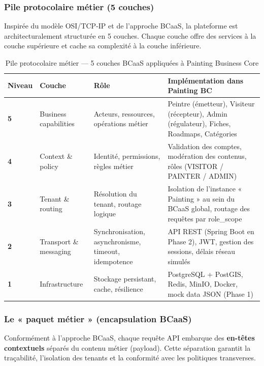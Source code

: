 \documentclass[12pt,a4paper]{report}
\begin{document}
\subsubsection*{Pile protocolaire métier (5 couches)}

Inspirée du modèle OSI/TCP-IP et de l'approche BCaaS, la plateforme est architecturalement structurée en 5 couches. Chaque couche offre des services à la couche supérieure et cache sa complexité à la couche inférieure.

\begin{table}[H]
\centering
\caption{Pile protocolaire métier --- 5 couches BCaaS appliquées à Painting Business Core}
\label{tab:protocol_stack}
\small
\begin{tabular}{|p{}|p{}|p{}|p{}|}
\hline
\textbf{Niveau} & \textbf{Couche} & \textbf{Rôle} & \textbf{Implémentation dans Painting BC} \\
\hline
\textbf{5} & Business capabilities & Acteurs, ressources, opérations métier & Peintre (émetteur), Visiteur (récepteur), Admin (régulateur), Fiches, Roadmaps, Catégories \\
\hline
\textbf{4} & Context \& policy & Identité, permissions, règles métier & Validation des comptes, modération des contenus, rôles (VISITOR / PAINTER / ADMIN) \\
\hline
\textbf{3} & Tenant \& routing & Résolution du tenant, routage logique & Isolation de l'instance « Painting » au sein du BCaaS global, routage des requêtes par role\_scope \\
\hline
\textbf{2} & Transport \& messaging & Synchronisation, asynchronisme, timeout, idempotence & API REST (Spring Boot en Phase 2), JWT, gestion des sessions, délais réseau simulés \\
\hline
\textbf{1} & Infrastructure & Stockage persistant, cache, résilience & PostgreSQL + PostGIS, Redis, MinIO, Docker, mock data JSON (Phase 1) \\
\hline
\end{tabular}
\end{table}

\subsubsection*{Le « paquet métier » (encapsulation BCaaS)}

Conformément à l'approche BCaaS, chaque requête API embarque des \textbf{en-têtes contextuels} séparés du contenu métier (payload). Cette séparation garantit la traçabilité, l'isolation des tenants et la conformité avec les politiques transverses.
\end{document}
